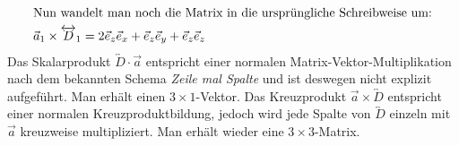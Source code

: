 \begin{description}
\begin{align*}
\intertext{Nun wandelt man noch die Matrix in die ursprüngliche Schreibweise um:}
\vec{a}_1 \times \overleftrightarrow{D}_1 &= 2\vec{e}_z\vec{e}_x + \vec{e}_z\vec{e}_y + \vec{e}_z\vec{e}_z
\end{align*}
Das Skalarprodukt $\overleftrightarrow{D} \cdot \vec{a}$ entspricht einer normalen Matrix-Vektor-Multiplikation nach dem bekannten Schema \textit{Zeile mal Spalte} und ist deswegen nicht explizit aufgeführt. Man erhält einen $3\times 1$-Vektor. Das Kreuzprodukt $\vec{a} \times \overleftrightarrow{D}$ entspricht einer normalen Kreuzproduktbildung, jedoch wird jede Spalte von $\overleftrightarrow{D}$ einzeln mit $\vec{a}$ kreuzweise multipliziert. Man erhält wieder eine $3\times 3$-Matrix.
\end{description}
